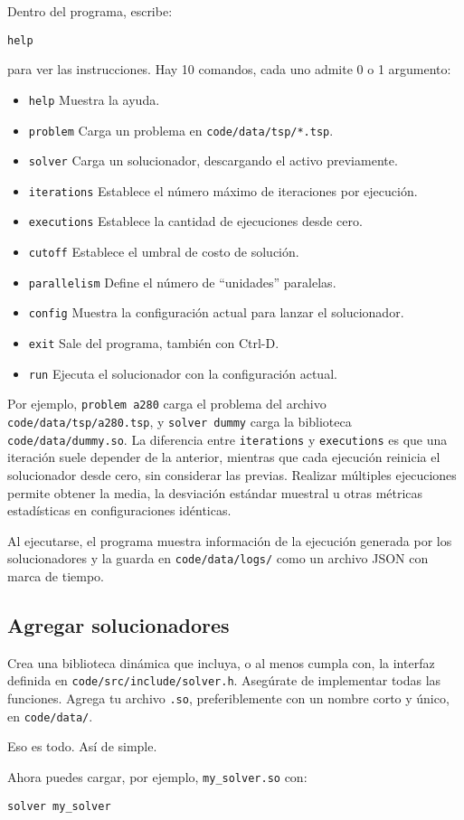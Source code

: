 \documentclass[main.tex]{subfiles}
\begin{document}
\begin{mdframed}[linewidth=2pt]
Dentro del programa, escribe:
\begin{verbatim}
help
\end{verbatim}
para ver las instrucciones. Hay 10 comandos, cada uno admite 0 o 1 argumento:
\begin{itemize}
  \item \texttt{help}        Muestra la ayuda.
  \item \texttt{problem}     Carga un problema en \texttt{code/data/tsp/*.tsp}.
  \item \texttt{solver}      Carga un solucionador, descargando el activo previamente.
  \item \texttt{iterations}  Establece el número máximo de iteraciones por ejecución.
  \item \texttt{executions}  Establece la cantidad de ejecuciones desde cero.
  \item \texttt{cutoff}      Establece el umbral de costo de solución.
  \item \texttt{parallelism} Define el número de “unidades” paralelas.
  \item \texttt{config}      Muestra la configuración actual para lanzar el solucionador.
  \item \texttt{exit}        Sale del programa, también con Ctrl-D.
  \item \texttt{run}         Ejecuta el solucionador con la configuración actual.
\end{itemize}

Por ejemplo, \texttt{problem a280} carga el problema del archivo \texttt{code/data/tsp/a280.tsp}, y \texttt{solver dummy} carga la biblioteca \texttt{code/data/dummy.so}.  
La diferencia entre \texttt{iterations} y \texttt{executions} es que una iteración suele depender de la anterior, mientras que cada ejecución reinicia el solucionador desde cero, sin considerar las previas. Realizar múltiples ejecuciones permite obtener la media, la desviación estándar muestral u otras métricas estadísticas en configuraciones idénticas.  

Al ejecutarse, el programa muestra información de la ejecución generada por los solucionadores y la guarda en \texttt{code/data/logs/} como un archivo JSON con marca de tiempo.

\subsection*{Agregar solucionadores}
Crea una biblioteca dinámica que incluya, o al menos cumpla con, la interfaz definida en \texttt{code/src/include/solver.h}. Asegúrate de implementar todas las funciones.  
Agrega tu archivo \texttt{.so}, preferiblemente con un nombre corto y único, en \texttt{code/data/}.  

Eso es todo. Así de simple.  

Ahora puedes cargar, por ejemplo, \texttt{my\_solver.so} con:
\begin{verbatim}
solver my_solver
\end{verbatim}

\end{mdframed}
\end{document}
